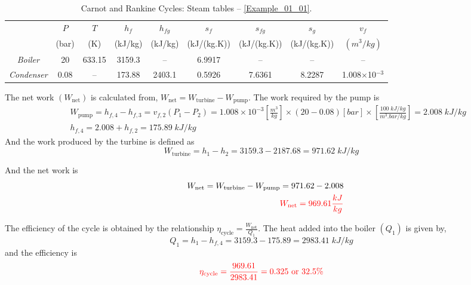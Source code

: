 \documentclass[12pts,a4paper,amsmath,amssymb,floatfix]{article}%
\newcommand{\frc}{\displaystyle\frac}
\begin{document}
\begin{enumerate}[label=\bfseries Example \arabic*]
\begin{center}
\begin{table}[h]
\begin{tabular}{c c c c c c c c c }
\hline
                    & $P$   & $T$ &  $h_{f}$  & $h_{fg}$ & $s_{f}$      & $s_{fg}$      & $s_{g}$        &   $v_{f}$ \\
                    & (bar) & (K) &  (kJ/kg) &  (kJ/kg) & (kJ/(kg.K)) & (kJ/(kg.K))   & (kJ/(kg.K))   &$\left(m^{3}/kg\right)$ \\
\hline
{\it Boiler}        & 20    & 633.15& 3159.3  & --      & 6.9917      & --            & --             & --  \\
\hline
{\it Condenser}     & 0.08  &  --  & 173.88  & 2403.1   & 0.5926      &  7.6361       & 8.2287         & 1.008$\times$10$^{-3}$ \\
\hline
\end{tabular}
\caption{Carnot and Rankine Cycles: Steam tables -- \ref{Example_01_01}.}
\label{Example01_01:Table1}
\end{table}
\end{center}

The net work $\left(W_{\text{net}}\right)$ is calculated from, $W_{\text{net}}=W_{\text{turbine}}-W_{\text{pump}}$. The work required by the pump is
\begin{eqnarray}
&& W_{\text{pump}}=h_{f,4}-h_{f,3}=v_{f,2}\left(P_{1}-P_{2}\right) = 1.008\times 10^{-3} \left[\frc{m^{3}}{kg}\right] \times (20-0.08) [bar] \times \left[\frc{100\;kJ/kg}{m^{3}.bar/kg}\right] = 2.008\; kJ/kg \nonumber \\
&& h_{f,4} = 2.008+h_{f,2}=175.89\;kJ/kg\nonumber
\end{eqnarray}
And the work produced by the turbine is defined as
\begin{displaymath}
W_{\text{turbine}}=h_{1}-h_{2} = 3159.3-2187.68= 971.62 \; kJ/kg
\end{displaymath}

And the net work is
\begin{eqnarray}
&& W_{\text{net}}=W_{\text{turbine}}-W_{\text{pump}} = 971.62-2.008 \nonumber \\
&& \textcolor{red}{W_{\text{net}}=969.61\frc{kJ}{kg}} \nonumber
\end{eqnarray}

The efficiency of the cycle is obtained by the relationship $\eta_{\text{cycle}}=\frc{W_{\text{net}}}{Q_{1}}$. The heat added into the boiler $\left(Q_{1}\right)$ is given by,
\begin{displaymath}
Q_{1}=h_{1}-h_{f,4}=3159.3-175.89=2983.41\;kJ/kg
\end{displaymath}
and the efficiency is
\begin{displaymath}
\textcolor{red}{\eta_{\text{cycle}}=\frc{969.61}{2983.41}=0.325\text{ or } 32.5\%}
\end{displaymath}





\end{enumerate}
\end{document}
